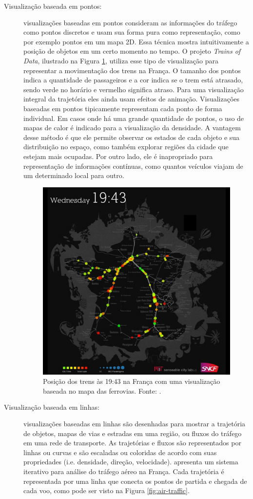 \begin{description}
  \item[Visualização baseada em pontos:] visualizações baseadas em pontos
consideram as informações do tráfego como pontos discretos e usam sua forma
pura como representação, como por exemplo pontos em um mapa 2D. Essa técnica
mostra intuitivamente a posição de objetos em um certo momento no tempo. O
projeto \emph{Trains of Data}, ilustrado na Figura \ref{fig:trains-of-data},
utiliza esse tipo de visualização para representar a movimentação dos trens na
França. O tamanho dos pontos indica a quantidade de passageiros e a cor indica
se o trem está atrasado, sendo verde no horário e vermelho significa atraso.
Para uma visualização integral da trajetória eles ainda usam efeitos de
animação. Visualizações baseadas em pontos tipicamente representam cada ponto
de forma individual. Em casos onde há uma grande quantidade de pontos, o uso de
mapas de calor é indicado para a visualização da densidade. A vantagem desse
método é que ele permite observar os estados de cada objeto e sua distribuição
no espaço, como também explorar regiões da cidade que estejam mais ocupadas.
Por outro lado, ele é inapropriado para representação de informações contínuas,
como quantos veículos viajam de um determinado local para outro.

\begin{figure}[!htb]
  \centering
  \includegraphics[width=.6\textwidth]{../figuras/trains-of-data.jpg}
  \caption[Visualização baseada no mapa das ferrovias da França]{Posição dos trens às 19:43 na França com uma visualização baseada no mapa
das ferrovias. Fonte: \citet{Senseable2018}.}
  \label{fig:trains-of-data}
\end{figure}

  \item[Visualização baseada em linhas:] visualizações baseadas em linhas são
desenhadas para mostrar a trajetória de objetos, mapas de vias e estradas em
uma região, ou fluxos do tráfego em uma rede de transporte. As trajetórias e
fluxos são representados por linhas ou curvas e são escaladas ou coloridas de
acordo com suas propriedades (i.e. densidade, direção, velocidade).
\citet{Klein2013} apresenta um sistema iterativo para análise do tráfego aéreo
na França. Cada trajetória é representada por uma linha que conecta os pontos
de partida e chegada de cada voo, como pode ser visto na Figura
\ref{fig:air-traffic}.


\end{description}
